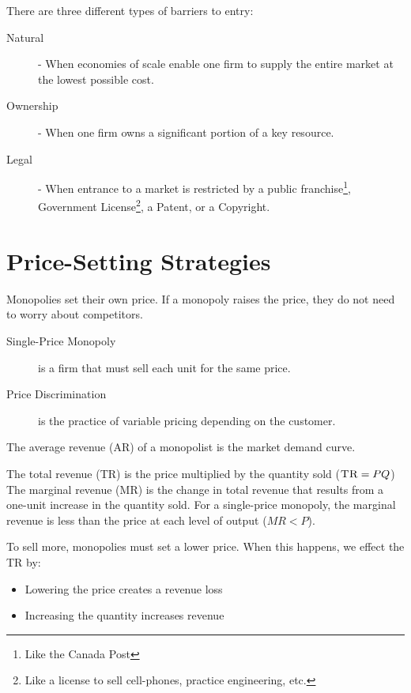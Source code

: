            There are three different types of barriers to entry:
            \begin{description}
                \item[Natural] - When economies of scale enable one firm to supply the entire market at the lowest possible cost.
                \item[Ownership] - When one firm owns a significant portion of a key resource.
                \item[Legal] - When entrance to a market is restricted by a public franchise\footnote{Like the Canada Post}, Government License\footnote{Like a license to sell cell-phones, practice engineering, etc.}, a Patent, or a Copyright.
            \end{description}

            \section{Price-Setting Strategies} %
            \label{sec:price_setting_strategies}
                Monopolies set their own price.
                If a monopoly raises the price, they do not need to worry about competitors.

                \begin{description}
                    \item[Single-Price Monopoly] is a firm that must sell each unit for the same price.
                    \item[Price Discrimination] is the practice of variable pricing depending on the customer.
                \end{description}

                The average revenue (\textsc{AR}) of a monopolist is the market demand curve.

                The total revenue (\textsc{TR}) is the price multiplied by the quantity sold ($\textsc{TR} = PQ$)
                The marginal revenue (\textsc{MR}) is the change in total revenue that results from a one-unit increase in the quantity sold.
                For a single-price monopoly, the marginal revenue is less than the price at each level of output ($MR < P$).

                To sell more, monopolies must set a lower price.
                When this happens, we effect the TR by:
                \begin{itemize}
                    \item Lowering the price creates a revenue loss
                    \item Increasing the quantity increases revenue
                \end{itemize}

